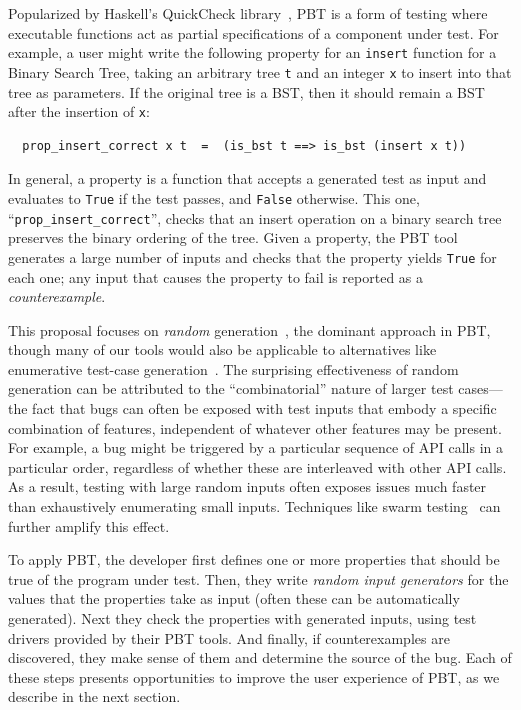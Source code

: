 
%
Popularized by Haskell's QuickCheck library~\cite{hughes2007quickcheck},
PBT is a form of testing where
executable functions act as partial
specifications of a component under test. For example, a user might
write the following property for an \lstinline{insert}
function for a Binary Search Tree, taking an arbitrary tree \texttt{t}
and an integer
\texttt{x} to insert into that tree as parameters. If the original tree
is a BST, then it should remain
a BST after the insertion of \texttt{x}:
\begin{lstlisting}
  prop_insert_correct x t  =  (is_bst t ==> is_bst (insert x t))
\end{lstlisting}
In general, a property is a function that
accepts a generated
test as input and evaluates to \lstinline{True} if the test passes, and
\lstinline{False} otherwise.  This one, ``\verb|prop_insert_correct|'',
checks that an insert operation on a binary search tree preserves the
binary ordering of the tree.
Given a property, the PBT tool generates a
large number of inputs and
checks that the property yields \lstinline{True} for each one; any input
that causes the property to fail is reported as a {\em counterexample}.

This proposal focuses on {\em random}
generation~\cite{hamlet1994random}, the dominant approach in PBT,
though many of our tools would
also be applicable to alternatives like enumerative test-case
generation~\cite{DBLP:conf/haskell/RuncimanNL08, leancheck}.
The surprising effectiveness of random generation can be attributed to the
``combinatorial'' nature of larger test cases---the fact that bugs can often be
exposed with test inputs that embody a specific combination of features,
independent of whatever other features may be present. For example,
a bug might be triggered by a particular sequence of API calls in a
particular order,
regardless of whether these are
interleaved with other API calls. As a result, testing with large random
inputs often exposes issues much faster than exhaustively enumerating
small inputs.  Techniques like swarm testing~\cite{groce2012swarm} can
further amplify this effect.

To apply PBT, the developer first defines one or more properties that
should be true of the program under test. Then, they write {\em random
  input generators} for the values that the properties take as input
(often these can be automatically generated). Next they check the
properties with generated inputs, using test drivers provided by their
PBT tools. And finally, if counterexamples are discovered, they make
sense of them and determine the source of the bug.  Each of these
steps presents opportunities to improve the user experience of PBT, as
we describe in the next section.

